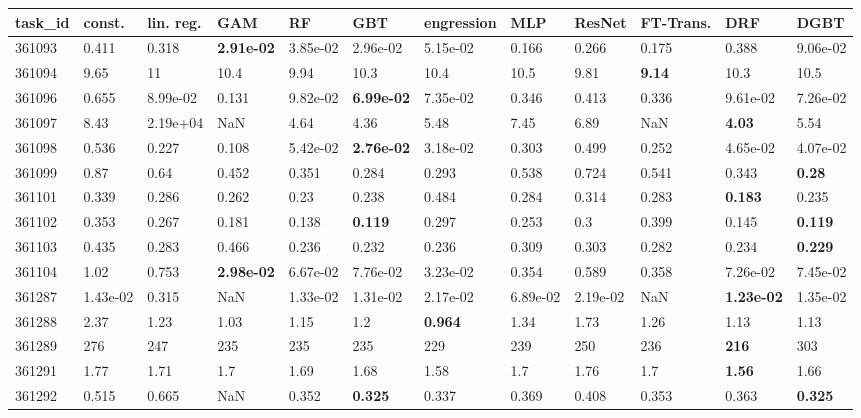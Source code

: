 \begin{table}[ht!]
\centering
\begingroup\footnotesize
\begin{tabular}{llllllllllll}
  \hline
\hline
task\_id & const. & lin. reg. & GAM & RF & GBT & engression & MLP & ResNet & FT-Trans. & DRF & DGBT \\ 
  \hline
361093 & 0.411 & 0.318 & \textbf{2.91e-02} & 3.85e-02 & 2.96e-02 & 5.15e-02 & 0.166 & 0.266 & 0.175 & 0.388 & 9.06e-02 \\ 
  361094 & 9.65 & 11 & 10.4 & 9.94 & 10.3 & 10.4 & 10.5 & 9.81 & \textbf{9.14} & 10.3 & 10.5 \\ 
  361096 & 0.655 & 8.99e-02 & 0.131 & 9.82e-02 & \textbf{6.99e-02} & 7.35e-02 & 0.346 & 0.413 & 0.336 & 9.61e-02 & 7.26e-02 \\ 
  361097 & 8.43 & 2.19e+04 & NaN & 4.64 & 4.36 & 5.48 & 7.45 & 6.89 & NaN & \textbf{4.03} & 5.54 \\ 
  361098 & 0.536 & 0.227 & 0.108 & 5.42e-02 & \textbf{2.76e-02} & 3.18e-02 & 0.303 & 0.499 & 0.252 & 4.65e-02 & 4.07e-02 \\ 
  361099 & 0.87 & 0.64 & 0.452 & 0.351 & 0.284 & 0.293 & 0.538 & 0.724 & 0.541 & 0.343 & \textbf{0.28} \\ 
  361101 & 0.339 & 0.286 & 0.262 & 0.23 & 0.238 & 0.484 & 0.284 & 0.314 & 0.283 & \textbf{0.183} & 0.235 \\ 
  361102 & 0.353 & 0.267 & 0.181 & 0.138 & \textbf{0.119} & 0.297 & 0.253 & 0.3 & 0.399 & 0.145 & \textbf{0.119} \\ 
  361103 & 0.435 & 0.283 & 0.466 & 0.236 & 0.232 & 0.236 & 0.309 & 0.303 & 0.282 & 0.234 & \textbf{0.229} \\ 
  361104 & 1.02 & 0.753 & \textbf{2.98e-02} & 6.67e-02 & 7.76e-02 & 3.23e-02 & 0.354 & 0.589 & 0.358 & 7.26e-02 & 7.45e-02 \\ 
  361287 & 1.43e-02 & 0.315 & NaN & 1.33e-02 & 1.31e-02 & 2.17e-02 & 6.89e-02 & 2.19e-02 & NaN & \textbf{1.23e-02} & 1.35e-02 \\ 
  361288 & 2.37 & 1.23 & 1.03 & 1.15 & 1.2 & \textbf{0.964} & 1.34 & 1.73 & 1.26 & 1.13 & 1.13 \\ 
  361289 & 276 & 247 & 235 & 235 & 235 & 229 & 239 & 250 & 236 & \textbf{216} & 303 \\ 
  361291 & 1.77 & 1.71 & 1.7 & 1.69 & 1.68 & 1.58 & 1.7 & 1.76 & 1.7 & \textbf{1.56} & 1.66 \\ 
  361292 & 0.515 & 0.665 & NaN & 0.352 & \textbf{0.325} & 0.337 & 0.369 & 0.408 & 0.353 & 0.363 & \textbf{0.325} \\ 

\end{tabular}
\end{table}
